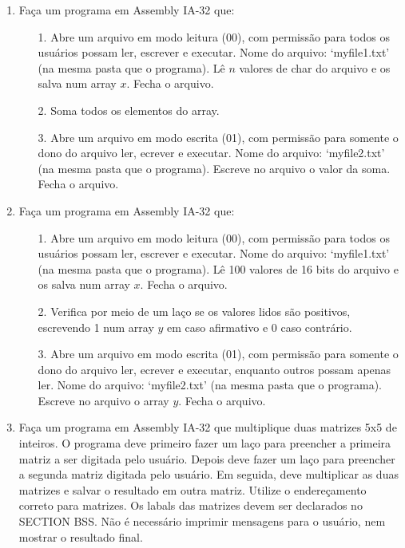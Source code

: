 \begin{enumerate}[resume]
    \item
    Faça um programa em Assembly IA-32 que:
    \begin{enumerate}
        \item [1.]
        Abre um arquivo em modo leitura (00), 
        com permissão para todos os usuários 
        possam ler, escrever e executar. 
        Nome do arquivo: `myfile1.txt' (na mesma pasta que o programa). 
        Lê $n$ valores de char do arquivo e os salva num array $x$. 
        Fecha o arquivo.

        \item [2.]
        Soma todos os elementos do array.

        \item [3.]
        Abre um arquivo em modo escrita (01), com permissão
        para somente o dono do arquivo ler, ecrever e executar. 
        Nome do arquivo: `myfile2.txt' (na mesma pasta que o programa). 
        Escreve no arquivo o valor da soma.
        Fecha o arquivo.
    \end{enumerate}

    \item
    Faça um programa em Assembly IA-32 que:
    \begin{enumerate}
        \item [1.]
        Abre um arquivo em modo leitura (00), 
        com permissão para todos os usuários 
        possam ler, escrever e executar. 
        Nome do arquivo: `myfile1.txt' (na mesma pasta que o programa). 
        Lê 100 valores de 16 bits do arquivo e os salva num array $x$. 
        Fecha o arquivo.

        \item [2.]
        Verifica por meio de um laço se os valores lidos são positivos,
        escrevendo 1 num array $y$ em caso afirmativo e 0 caso contrário.

        \item [3.]
        Abre um arquivo em modo escrita (01), com permissão
        para somente o dono do arquivo ler, ecrever e executar,
        enquanto outros possam apenas ler. 
        Nome do arquivo: `myfile2.txt' (na mesma pasta que o programa). 
        Escreve no arquivo o array $y$.
        Fecha o arquivo.
    \end{enumerate}

    \item
    Faça um programa em Assembly IA-32
    que multiplique duas matrizes 5x5 de inteiros.
    O programa deve primeiro fazer um laço 
    para preencher a primeira matriz a ser digitada pelo usuário.
    Depois deve fazer um laço 
    para preencher a segunda matriz digitada pelo usuário.
    Em seguida, deve multiplicar as duas matrizes
    e salvar o resultado em outra matriz.
    Utilize o endereçamento correto para matrizes.
    Os labals das matrizes devem ser declarados no SECTION BSS.
    Não é necessário imprimir mensagens para o usuário,
    nem mostrar o resultado final.


\end{enumerate}
